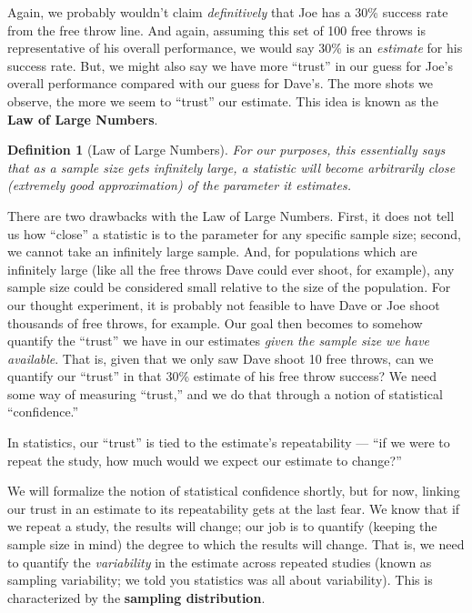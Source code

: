 \documentclass[
]{book}
\theoremstyle{plain}
\theoremstyle{mydefn}
\newtheorem{definition}{Definition}[chapter]
\theoremstyle{myexmpl}
\theoremstyle{remark}
\begin{document}
Again, we probably wouldn't claim \emph{definitively} that Joe has a 30\% success rate from the free throw line. And again, assuming this set of 100 free throws is representative of his overall performance, we would say 30\% is an \emph{estimate} for his success rate. But, we might also say we have more ``trust'' in our guess for Joe's overall performance compared with our guess for Dave's. The more shots we observe, the more we seem to ``trust'' our estimate. This idea is known as the \textbf{Law of Large Numbers}.

\begin{definition}[Law of Large Numbers]
\protect\hypertarget{def:defn-lln}{}{\label{def:defn-lln} {} }For our purposes, this essentially says that as a sample size gets infinitely large, a statistic will become arbitrarily close (extremely good approximation) of the parameter it estimates.
\end{definition}

There are two drawbacks with the Law of Large Numbers. First, it does not tell us how ``close'' a statistic is to the parameter for any specific sample size; second, we cannot take an infinitely large sample. And, for populations which are infinitely large (like all the free throws Dave could ever shoot, for example), any sample size could be considered small relative to the size of the population. For our thought experiment, it is probably not feasible to have Dave or Joe shoot thousands of free throws, for example. Our goal then becomes to somehow quantify the ``trust'' we have in our estimates \emph{given the sample size we have available}. That is, given that we only saw Dave shoot 10 free throws, can we quantify our ``trust'' in that 30\% estimate of his free throw success? We need some way of measuring ``trust,'' and we do that through a notion of statistical ``confidence.''

\begin{rmdkeyidea}
In statistics, our ``trust'' is tied to the estimate's repeatability --- ``if we were to repeat the study, how much would we expect our estimate to change?''\\
\end{rmdkeyidea}

We will formalize the notion of statistical confidence shortly, but for now, linking our trust in an estimate to its repeatability gets at the last fear. We know that if we repeat a study, the results will change; our job is to quantify (keeping the sample size in mind) the degree to which the results will change. That is, we need to quantify the \emph{variability} in the estimate across repeated studies (known as sampling variability; we told you statistics was all about variability). This is characterized by the \textbf{sampling distribution}.
\end{document}
